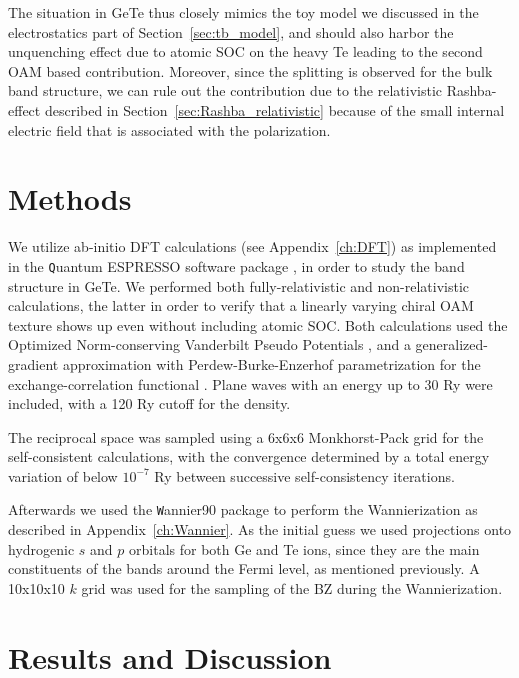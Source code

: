 The situation in GeTe thus closely mimics the toy model we discussed in the electrostatics part of Section~\ref{sec:tb_model}, and should also harbor the unquenching effect due to atomic SOC on the heavy Te leading to the second OAM based contribution.
Moreover, since the splitting is observed for the bulk band structure, we can rule out the contribution due to the relativistic Rashba-effect described in Section~\ref{sec:Rashba_relativistic} because of the small internal electric field that is associated with the polarization.

\section{Methods}
We utilize ab-initio DFT calculations (see Appendix~\ref{ch:DFT}) as implemented in the {\texttt Quantum ESPRESSO} software package \cite{Giannozzi2009}, in order to study the band structure in GeTe.
We performed both fully-relativistic and non-relativistic calculations, the latter in order to verify that a linearly varying chiral OAM texture shows up even without including atomic SOC.
Both calculations used the Optimized Norm-conserving Vanderbilt Pseudo Potentials \cite{Hamann2013}, and a generalized-gradient approximation \cite{Perdew1993} with Perdew-Burke-Enzerhof parametrization for the exchange-correlation functional \cite{Perdew1996}.
Plane waves with an energy up to 30 Ry were included, with a 120 Ry cutoff for the density.

The reciprocal space was sampled using a 6x6x6 Monkhorst-Pack grid \cite{Pack1977} for the self-consistent calculations, with the convergence determined by a total energy variation of below $10^{-7}$ Ry between successive self-consistency iterations.

Afterwards we used the {\texttt Wannier90} package \cite{Mostofi2014AnFunctions} to perform the Wannierization as described in Appendix~\ref{ch:Wannier}.
As the initial guess we used projections onto hydrogenic $s$ and $p$ orbitals for both Ge and Te ions, since they are the main constituents of the bands around the Fermi level, as mentioned previously.
A 10x10x10 $k$ grid was used for the sampling of the BZ during the Wannierization. 

\section{Results and Discussion}

